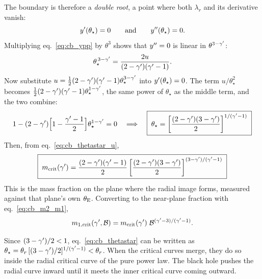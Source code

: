 The boundary is therefore a \emph{double root}, a point where both
$\lambda_r$ and its derivative vanish:
\begin{equation}
  y'(\theta_\star)=0 \qquad\text{and}\qquad y''(\theta_\star)=0 .
  \label{eq:cb_double_root}
\end{equation}
Multiplying eq.~\eqref{eq:cb_ypp} by $\theta^3$ shows that $y''=0$
is linear in $\theta^{3-\gamma'}$:
\begin{equation}
  \theta_\star^{\,3-\gamma'} = \frac{2u}{(2-\gamma')(\gamma'-1)} .
  \label{eq:cb_thetastar_u}
\end{equation}
Now substitute $u = \tfrac12(2-\gamma')(\gamma'-1)\theta_\star^{3-\gamma'}$ into
$y'(\theta_\star)=0$. The term $u/\theta_\star^2$ becomes
$\tfrac12(2-\gamma')(\gamma'-1)\theta_\star^{1-\gamma'}$, the same power of
$\theta_\star$ as the middle term, and the two combine:
\begin{equation}
  1 - (2-\gamma')\Big[1-\frac{\gamma'-1}{2}\Big]\theta_\star^{1-\gamma'} = 0
  \quad\Longrightarrow\quad
  \boxed{\;\theta_\star = \left[\frac{(2-\gamma')(3-\gamma')}{2}\right]^{1/(\gamma'-1)}\;}
  \label{eq:cb_thetastar}
\end{equation}
Then, from eq.~\eqref{eq:cb_thetastar_u},
\begin{equation}
  \boxed{\;
  m_{\rm crit}(\gamma') = \frac{(2-\gamma')(\gamma'-1)}{2}
  \left[\frac{(2-\gamma')(3-\gamma')}{2}\right]^{(3-\gamma')/(\gamma'-1)}
  \;}
  \label{eq:cb_mcrit}
\end{equation}
This is the mass fraction on the plane where the radial image forms,
measured against that plane's own $\theta_{\mathrm{E}}$. Converting to the near-plane
fraction with eq.~\eqref{eq:cb_m2_m1},
\begin{equation}
  m_{1,\rm crit}(\gamma',\mathcal{B}) = m_{\rm crit}(\gamma')\;\mathcal{B}^{(\gamma'-3)/(\gamma'-1)} .
  \label{eq:cb_m1crit}
\end{equation}

\begin{annotation}
Since $(3-\gamma')/2<1$, eq.~\eqref{eq:cb_thetastar} can be written as
$\theta_\star=\theta_r\,[(3-\gamma')/2]^{1/(\gamma'-1)}<\theta_r$. When the
critical curves merge, they do so inside the radial critical curve
of the pure power law. The black hole pushes the radial curve inward
until it meets the inner critical curve coming outward.
\end{annotation}

